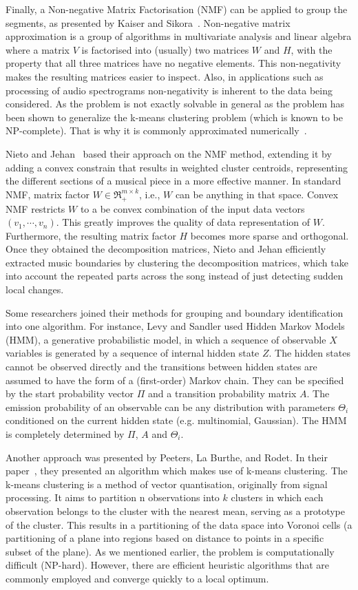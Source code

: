 Finally, a Non-negative Matrix Factorisation (NMF) can be applied to group the segments, as presented by Kaiser and Sikora~\cite{Sikora}. Non-negative matrix approximation is a group of algorithms in multivariate analysis and linear algebra where a matrix $V$ is factorised into (usually) two matrices $W$ and $H$, with the property that all three matrices have no negative elements. This non-negativity makes the resulting matrices easier to inspect. Also, in applications such as processing of audio spectrograms non-negativity is inherent to the data being considered. As the problem is not exactly solvable in general as the problem has been shown to generalize the k-means clustering problem (which is known to be NP-complete). That is why it is commonly approximated numerically~\cite{NMFNP}.

Nieto and Jehan~\cite{Nieto} based their approach on the NMF method, extending it by adding a convex constrain that results in weighted cluster centroids, representing the different sections of a musical piece in a more effective manner. 
In standard NMF, matrix factor $W \in \Re^{m \times k}_{+}$, i.e., $W$ can be anything in that space. Convex NMF restricts $W$ to a be convex combination of the input data vectors  $(v_1, \cdots, v_n)$. This greatly improves the quality of data representation of $W$. Furthermore, the resulting matrix factor $H$ becomes more sparse and orthogonal. Once they obtained the decomposition matrices, Nieto and Jehan efficiently extracted music boundaries by clustering the decomposition matrices, which take into account the repeated parts across the song instead of just detecting sudden local changes.

Some researchers joined their methods for grouping and boundary identification into one algorithm. For instance, Levy and Sandler used Hidden Markov Models (HMM), a generative probabilistic model, in which a sequence of observable $X$ variables is generated by a sequence of internal hidden state $Z$. The hidden states cannot be observed directly and the transitions between hidden states are assumed to have the form of a (first-order) Markov chain. They can be specified by the start probability vector $\Pi$ and a transition probability matrix $A$. The emission probability of an observable can be any distribution with parameters $\Theta_{i}$ conditioned on the current hidden state (e.g. multinomial, Gaussian). The HMM is completely determined by $\Pi$, $A$ and $\Theta_{i}$.

Another approach was presented by Peeters, La Burthe, and Rodet. In their paper~\cite{Peeters}, they presented an algorithm which makes use of k-means clustering. The k-means clustering is a method of vector quantisation, originally from signal processing. It aims to partition n observations into $k$ clusters in which each observation belongs to the cluster with the nearest mean, serving as a prototype of the cluster. This results in a partitioning of the data space into Voronoi cells (a partitioning of a plane into regions based on distance to points in a specific subset of the plane).
As we mentioned earlier, the problem is computationally difficult (NP-hard). However, there are efficient heuristic algorithms that are commonly employed and converge quickly to a local optimum.

